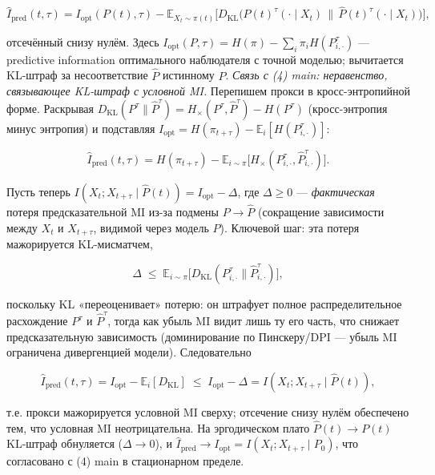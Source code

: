 \documentclass[pdflatex,sn-mathphys-ay]{sn-jnl}
\begin{document}
\[\widehat I_{\text{pred}}(t, \tau) = I_{\text{opt}}(P(t), \tau) - \mathbb{E}_{X_t \sim \pi(t)}\!\bigl[ D_{\text{KL}}\!\bigl(P(t)^\tau(\cdot \mid X_t)\,\|\,\hat{P}(t)^\tau(\cdot \mid X_t)\bigr) \bigr],\]



отсечённый снизу нулём. Здесь \(I_{\text{opt}}(P, \tau) = H(\pi) - \sum_i \pi_i H(P^\tau_{i,\cdot})\) --- predictive information оптимального наблюдателя с точной моделью; вычитается KL-штраф за несоответствие \(\hat{P}\) истинному \(P\). \emph{Связь с (4) main: неравенство, связывающее KL-штраф с условной MI.} Перепишем прокси в кросс-энтропийной форме. Раскрывая \(D_{\text{KL}}(P^\tau\|\hat P^\tau) = H_\times(P^\tau,\hat P^\tau) - H(P^\tau)\) (кросс-энтропия минус энтропия) и подставляя \(I_{\text{opt}} = H(\pi_{t+\tau}) - \mathbb{E}_i[H(P^\tau_{i,\cdot})]\):



\[\widehat I_{\text{pred}}(t,\tau) = H(\pi_{t+\tau}) - \mathbb{E}_{i\sim\pi}\bigl[H_\times(P^\tau_{i,\cdot}, \hat P^\tau_{i,\cdot})\bigr].\]



Пусть теперь \(I(X_t;X_{t+\tau}\mid\hat P(t)) = I_{\text{opt}} - \Delta\), где \(\Delta \ge 0\) --- \emph{фактическая} потеря предсказательной MI из-за подмены \(P \to \hat P\) (сокращение зависимости между \(X_t\) и \(X_{t+\tau}\), видимой через модель \(\hat P\)). Ключевой шаг: эта потеря мажорируется KL-мисматчем,



\[\Delta \;\le\; \mathbb{E}_{i\sim\pi}\bigl[D_{\text{KL}}(P^\tau_{i,\cdot}\|\hat P^\tau_{i,\cdot})\bigr],\]



поскольку KL «переоценивает» потерю: он штрафует полное распределительное расхождение \(P^\tau\) и \(\hat P^\tau\), тогда как убыль MI видит лишь ту его часть, что снижает предсказательную зависимость (доминирование по Пинскеру/DPI --- убыль MI ограничена дивергенцией модели). Следовательно



\[\widehat I_{\text{pred}}(t,\tau) = I_{\text{opt}} - \mathbb{E}_i[D_{\text{KL}}] \;\le\; I_{\text{opt}} - \Delta = I(X_t; X_{t+\tau}\mid\hat P(t)),\]



т.е. прокси мажорируется условной MI сверху; отсечение снизу нулём обеспечено тем, что условная MI неотрицательна. На эргодическом плато \(\hat P(t) \to P(t)\) KL-штраф обнуляется (\(\Delta \to 0\)), и \(\widehat I_{\text{pred}} \to I_{\text{opt}} = I(X_t; X_{t+\tau}\mid P_0)\), что согласовано с (4) main в стационарном пределе.
\end{document}
